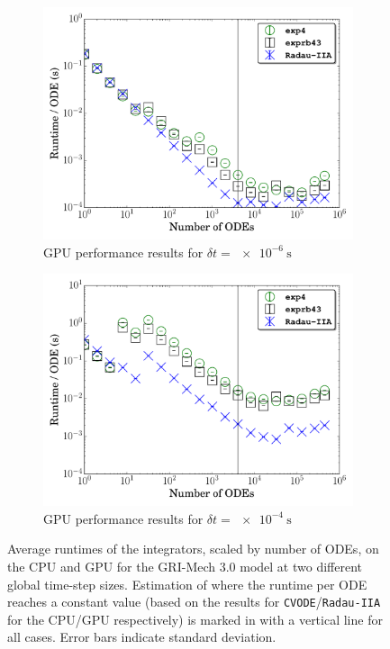 \documentclass[preprint]{elsarticle}
\begin{document}
\begin{figure}[htb]
\begin{subfigure}{0.49\textwidth}
      \includegraphics[width=\linewidth]{CH4_1e-06_gpu.pdf}
      \caption{GPU performance results for $\delta t = \SI{e-6}{\second}$}
      \label{F:ch4_gpu_perf_small}
  \end{subfigure}
  \begin{subfigure}{0.49\textwidth}
      \includegraphics[width=\linewidth]{CH4_1e-04_gpu.pdf}
      \caption{GPU performance results for $\delta t = \SI{e-4}{\second}$}
      \label{F:ch4_gpu_perf_large}
  \end{subfigure}
  \caption{Average runtimes of the integrators, scaled by number of ODEs, on the CPU and GPU for the GRI-Mech 3.0 model at two different global time-step sizes.
  Estimation of where the runtime per ODE reaches a constant value (based on the results for \texttt{CVODE}\slash\texttt{Radau-IIA} for the CPU\slash GPU respectively) is marked in with a vertical line for all cases.
  Error bars indicate standard deviation.}
  \label{F:CH4_perf}
\end{figure}
\end{document}
